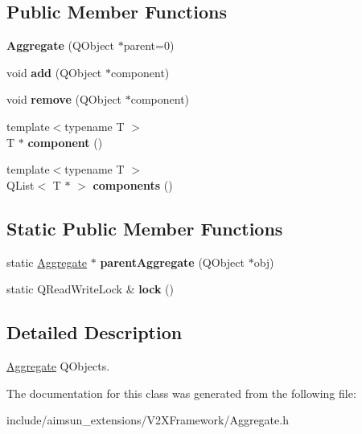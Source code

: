 \subsection*{Public Member Functions}
\begin{DoxyCompactItemize}
\item 
{\bfseries Aggregate} (Q\+Object $\ast$parent=0)\hypertarget{classAggregation_1_1Aggregate_a397a315b628eab40b6c2e5f6261acf92}{}\label{classAggregation_1_1Aggregate_a397a315b628eab40b6c2e5f6261acf92}

\item 
void {\bfseries add} (Q\+Object $\ast$component)\hypertarget{classAggregation_1_1Aggregate_a21a83089f1ff6e0d1091e82c951dc6cb}{}\label{classAggregation_1_1Aggregate_a21a83089f1ff6e0d1091e82c951dc6cb}

\item 
void {\bfseries remove} (Q\+Object $\ast$component)\hypertarget{classAggregation_1_1Aggregate_adfbc2d565f92c95c54f368fc36849fdc}{}\label{classAggregation_1_1Aggregate_adfbc2d565f92c95c54f368fc36849fdc}

\item 
{\footnotesize template$<$typename T $>$ }\\T $\ast$ {\bfseries component} ()\hypertarget{classAggregation_1_1Aggregate_a2d87bd4470b599441e1878e106549e25}{}\label{classAggregation_1_1Aggregate_a2d87bd4470b599441e1878e106549e25}

\item 
{\footnotesize template$<$typename T $>$ }\\Q\+List$<$ T $\ast$ $>$ {\bfseries components} ()\hypertarget{classAggregation_1_1Aggregate_a9480f9cd26b3e2a36dd873e8e4ec65f9}{}\label{classAggregation_1_1Aggregate_a9480f9cd26b3e2a36dd873e8e4ec65f9}

\end{DoxyCompactItemize}
\subsection*{Static Public Member Functions}
\begin{DoxyCompactItemize}
\item 
static \hyperlink{classAggregation_1_1Aggregate}{Aggregate} $\ast$ {\bfseries parent\+Aggregate} (Q\+Object $\ast$obj)\hypertarget{classAggregation_1_1Aggregate_af770efb28c5b48e5314df26c47cfae13}{}\label{classAggregation_1_1Aggregate_af770efb28c5b48e5314df26c47cfae13}

\item 
static Q\+Read\+Write\+Lock \& {\bfseries lock} ()\hypertarget{classAggregation_1_1Aggregate_ace3a0a25942a0dda3330b76d20778f55}{}\label{classAggregation_1_1Aggregate_ace3a0a25942a0dda3330b76d20778f55}

\end{DoxyCompactItemize}


\subsection{Detailed Description}
\hyperlink{classAggregation_1_1Aggregate}{Aggregate} Q\+Objects. 

The documentation for this class was generated from the following file\+:\begin{DoxyCompactItemize}
\item 
include/aimsun\+\_\+extensions/\+V2\+X\+Framework/Aggregate.\+h\end{DoxyCompactItemize}
